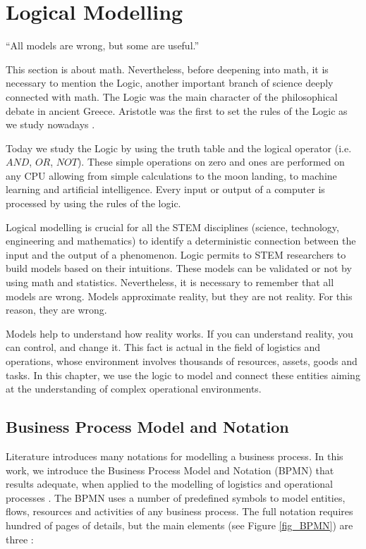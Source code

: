 


\chapter{Logical Modelling}{“All models are wrong, but some are useful.”}\label{chapLogicalModelling}

This section is about math. Nevertheless, before deepening into math, it is necessary to mention the Logic, another important branch of science deeply connected with math. The Logic was the main character of the philosophical debate in ancient Greece. Aristotle was the first to set the rules of the Logic as we study nowadays \cite{Aristoteles}. \par

Today we study the Logic by using the truth table and the logical operator (i.e. $AND$, $OR$, $NOT$). These simple operations on zero and ones are performed on any CPU allowing from simple calculations to the moon landing, to machine learning and artificial intelligence. Every input or output of a computer is processed by using the rules of the logic. \par

Logical modelling is crucial for all the STEM disciplines (science, technology, engineering and mathematics) to identify a deterministic connection between the input and the output of a phenomenon. Logic permits to STEM researchers to build models based on their intuitions. These models can be validated or not by using math and statistics. Nevertheless, it is necessary to remember that all models are wrong. Models approximate reality, but they are not reality. For this reason, they are wrong.\par

Models help to understand how reality works. If you can understand reality, you can control, and change it. This fact is actual in the field of logistics and operations, whose environment involves thousands of resources, assets, goods and tasks. In this chapter, we use the logic to model and connect these entities aiming at the understanding of complex operational environments.\par 

\section{Business Process Model and Notation} \label{secBPMN}
Literature introduces many notations for modelling a business process. In this work, we introduce the Business Process Model and Notation (BPMN) that results adequate, when applied to the modelling of logistics and operational processes \cite{OMG1998}. The BPMN uses a number of predefined symbols to model entities, flows, resources and activities of any business process. The full notation requires hundred of pages of details, but the main elements (see Figure \ref{fig_BPMN}) are three \cite{White2004}:


